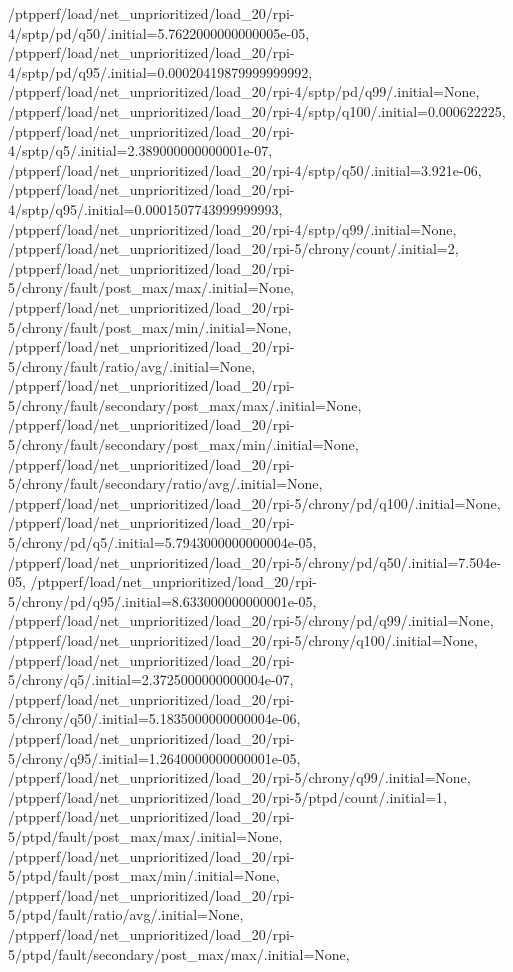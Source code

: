 {    /ptpperf/load/net_unprioritized/load_20/rpi-4/sptp/pd/q50/.initial=5.7622000000000005e-05,
    /ptpperf/load/net_unprioritized/load_20/rpi-4/sptp/pd/q95/.initial=0.00020419879999999992,
    /ptpperf/load/net_unprioritized/load_20/rpi-4/sptp/pd/q99/.initial=None,
    /ptpperf/load/net_unprioritized/load_20/rpi-4/sptp/q100/.initial=0.000622225,
    /ptpperf/load/net_unprioritized/load_20/rpi-4/sptp/q5/.initial=2.389000000000001e-07,
    /ptpperf/load/net_unprioritized/load_20/rpi-4/sptp/q50/.initial=3.921e-06,
    /ptpperf/load/net_unprioritized/load_20/rpi-4/sptp/q95/.initial=0.0001507743999999993,
    /ptpperf/load/net_unprioritized/load_20/rpi-4/sptp/q99/.initial=None,
    /ptpperf/load/net_unprioritized/load_20/rpi-5/chrony/count/.initial=2,
    /ptpperf/load/net_unprioritized/load_20/rpi-5/chrony/fault/post_max/max/.initial=None,
    /ptpperf/load/net_unprioritized/load_20/rpi-5/chrony/fault/post_max/min/.initial=None,
    /ptpperf/load/net_unprioritized/load_20/rpi-5/chrony/fault/ratio/avg/.initial=None,
    /ptpperf/load/net_unprioritized/load_20/rpi-5/chrony/fault/secondary/post_max/max/.initial=None,
    /ptpperf/load/net_unprioritized/load_20/rpi-5/chrony/fault/secondary/post_max/min/.initial=None,
    /ptpperf/load/net_unprioritized/load_20/rpi-5/chrony/fault/secondary/ratio/avg/.initial=None,
    /ptpperf/load/net_unprioritized/load_20/rpi-5/chrony/pd/q100/.initial=None,
    /ptpperf/load/net_unprioritized/load_20/rpi-5/chrony/pd/q5/.initial=5.7943000000000004e-05,
    /ptpperf/load/net_unprioritized/load_20/rpi-5/chrony/pd/q50/.initial=7.504e-05,
    /ptpperf/load/net_unprioritized/load_20/rpi-5/chrony/pd/q95/.initial=8.633000000000001e-05,
    /ptpperf/load/net_unprioritized/load_20/rpi-5/chrony/pd/q99/.initial=None,
    /ptpperf/load/net_unprioritized/load_20/rpi-5/chrony/q100/.initial=None,
    /ptpperf/load/net_unprioritized/load_20/rpi-5/chrony/q5/.initial=2.3725000000000004e-07,
    /ptpperf/load/net_unprioritized/load_20/rpi-5/chrony/q50/.initial=5.1835000000000004e-06,
    /ptpperf/load/net_unprioritized/load_20/rpi-5/chrony/q95/.initial=1.2640000000000001e-05,
    /ptpperf/load/net_unprioritized/load_20/rpi-5/chrony/q99/.initial=None,
    /ptpperf/load/net_unprioritized/load_20/rpi-5/ptpd/count/.initial=1,
    /ptpperf/load/net_unprioritized/load_20/rpi-5/ptpd/fault/post_max/max/.initial=None,
    /ptpperf/load/net_unprioritized/load_20/rpi-5/ptpd/fault/post_max/min/.initial=None,
    /ptpperf/load/net_unprioritized/load_20/rpi-5/ptpd/fault/ratio/avg/.initial=None,
    /ptpperf/load/net_unprioritized/load_20/rpi-5/ptpd/fault/secondary/post_max/max/.initial=None,
}
